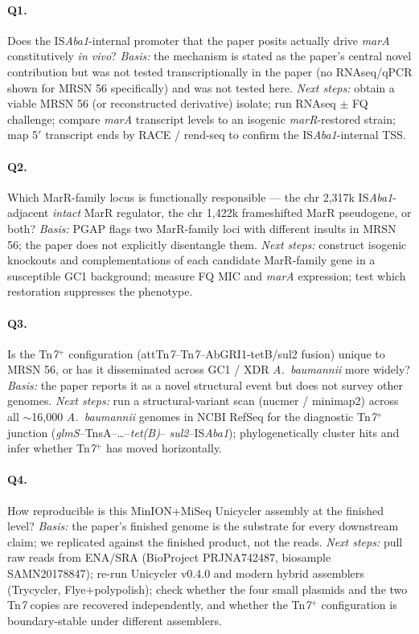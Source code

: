 \documentclass[11pt]{article}
\begin{document}
\paragraph{Q1.}  Does the IS\emph{Aba1}-internal promoter that the
paper posits actually drive \emph{marA} constitutively \emph{in vivo}?
\emph{Basis:} the mechanism is stated as the paper's central novel
contribution but was not tested transcriptionally in the paper (no
RNAseq/qPCR shown for MRSN 56 specifically) and was not tested here.
\emph{Next steps:} obtain a viable MRSN 56 (or reconstructed derivative)
isolate; run RNAseq $\pm$ FQ challenge; compare \emph{marA} transcript
levels to an isogenic \emph{marR}-restored strain; map 5$'$ transcript
ends by RACE / rend-seq to confirm the IS\emph{Aba1}-internal TSS.

\paragraph{Q2.}  Which MarR-family locus is functionally responsible ---
the chr 2{,}317k IS\emph{Aba1}-adjacent \emph{intact} MarR regulator,
the chr 1{,}422k frameshifted MarR pseudogene, or both?
\emph{Basis:} PGAP flags two MarR-family loci with different insults
in MRSN 56; the paper does not explicitly disentangle them.
\emph{Next steps:} construct isogenic knockouts and complementations
of each candidate MarR-family gene in a susceptible GC1 background;
measure FQ MIC and \emph{marA} expression; test which restoration
suppresses the phenotype.

\paragraph{Q3.}  Is the Tn\emph{7}$^{+}$ configuration
(attTn\emph{7}--Tn\emph{7}--AbGRI1-tetB/sul2 fusion) unique to MRSN 56,
or has it disseminated across GC1 / XDR \emph{A.~baumannii} more
widely?  \emph{Basis:} the paper reports it as a novel structural
event but does not survey other genomes.  \emph{Next steps:} run a
structural-variant scan (nucmer / minimap2) across all $\sim$16{,}000
\emph{A.~baumannii} genomes in NCBI RefSeq for the diagnostic
Tn\emph{7}$^{+}$ junction (\emph{glmS}--TnsA--\dots--\emph{tet(B)}--
\emph{sul2}--IS\emph{Aba1}); phylogenetically cluster hits and infer
whether Tn\emph{7}$^{+}$ has moved horizontally.

\paragraph{Q4.}  How reproducible is this MinION+MiSeq Unicycler
assembly at the finished level?  \emph{Basis:} the paper's finished
genome is the substrate for every downstream claim; we replicated
against the finished product, not the reads.  \emph{Next steps:} pull
raw reads from ENA/SRA (BioProject PRJNA742487, biosample SAMN20178847);
re-run Unicycler v0.4.0 and modern hybrid assemblers (Trycycler,
Flye+polypolish); check whether the four small plasmids and the two
Tn\emph{7} copies are recovered independently, and whether the
Tn\emph{7}$^{+}$ configuration is boundary-stable under different
assemblers.
\end{document}
